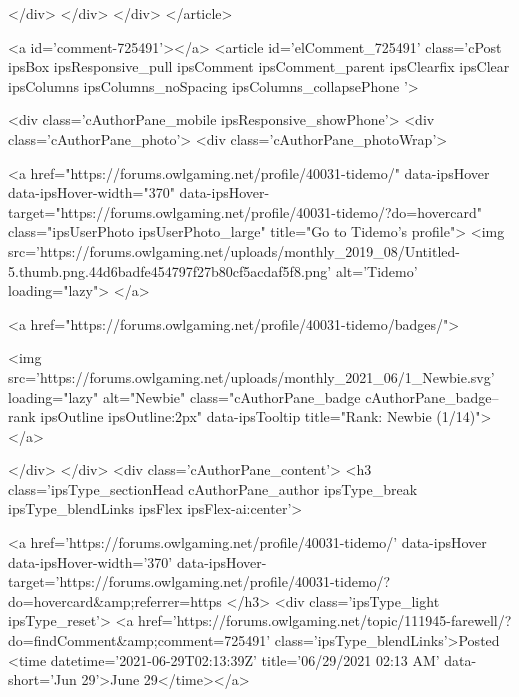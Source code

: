 	
</div>
</div>
	</div>
</article>
					
				
					
					
					



<a id='comment-725491'></a>
<article  id='elComment_725491' class='cPost ipsBox ipsResponsive_pull  ipsComment  ipsComment_parent ipsClearfix ipsClear ipsColumns ipsColumns_noSpacing ipsColumns_collapsePhone    '>
	

	

	<div class='cAuthorPane_mobile ipsResponsive_showPhone'>
		<div class='cAuthorPane_photo'>
			<div class='cAuthorPane_photoWrap'>
				


	<a href="https://forums.owlgaming.net/profile/40031-tidemo/" data-ipsHover data-ipsHover-width="370" data-ipsHover-target="https://forums.owlgaming.net/profile/40031-tidemo/?do=hovercard" class="ipsUserPhoto ipsUserPhoto_large" title="Go to Tidemo's profile">
		<img src='https://forums.owlgaming.net/uploads/monthly_2019_08/Untitled-5.thumb.png.44d6badfe454797f27b80cf5acdaf5f8.png' alt='Tidemo' loading="lazy">
	</a>

				
				
					<a href="https://forums.owlgaming.net/profile/40031-tidemo/badges/">
						
<img src='https://forums.owlgaming.net/uploads/monthly_2021_06/1_Newbie.svg' loading="lazy" alt="Newbie" class="cAuthorPane_badge cAuthorPane_badge--rank ipsOutline ipsOutline:2px" data-ipsTooltip title="Rank: Newbie (1/14)">
					</a>
				
			</div>
		</div>
		<div class='cAuthorPane_content'>
			<h3 class='ipsType_sectionHead cAuthorPane_author ipsType_break ipsType_blendLinks ipsFlex ipsFlex-ai:center'>
				


<a href='https://forums.owlgaming.net/profile/40031-tidemo/' data-ipsHover data-ipsHover-width='370' data-ipsHover-target='https://forums.owlgaming.net/profile/40031-tidemo/?do=hovercard&amp;referrer=https%
			</h3>
			<div class='ipsType_light ipsType_reset'>
				<a href='https://forums.owlgaming.net/topic/111945-farewell/?do=findComment&amp;comment=725491' class='ipsType_blendLinks'>Posted <time datetime='2021-06-29T02:13:39Z' title='06/29/2021 02:13  AM' data-short='Jun 29'>June 29</time></a>
				
